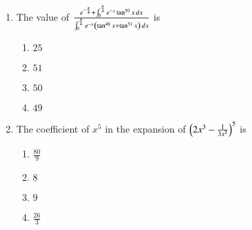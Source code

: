\documentclass[journal]{IEEEtran}
\theoremstyle{remark}
\begin{document}
\begin{enumerate}
\item The value of $\frac{e^{-\frac{\pi}{4}} + \int_0^{\frac{\pi}{4}} e^{-x} \tan^{50}x \, dx}{\int_0^{\frac{\pi}{4}} e^{-x} \left( \tan^{49}x + \tan^{51}x \right) \, dx}$ is

\begin{multicols}{4}
\begin{enumerate}
\item $25$
\item $51$
\item $50$
\item $49$
\end{enumerate}
\end{multicols}

\item The coefficient of $x^5$ in the expansion of ${\left(2x^3-\frac{1}{3x^2}\right)}^5$ is

\begin{multicols}{4}
\begin{enumerate}
\item $\frac{80}{9}$
\item $8$
\item $9$
\item $\frac{26}{3}$
\end{enumerate}
\end{multicols}



\end{enumerate}
\end{document}
